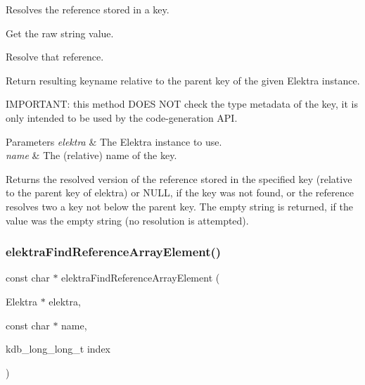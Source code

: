 Resolves the reference stored in a key. 


\begin{DoxyEnumerate}
\item Get the raw string value.
\item Resolve that reference.
\item Return resulting keyname relative to the parent key of the given Elektra instance.
\end{DoxyEnumerate}

I\+M\+P\+O\+R\+T\+A\+NT\+: this method D\+O\+ES N\+OT check the type metadata of the key, it is only intended to be used by the code-\/generation A\+PI.


\begin{DoxyParams}{Parameters}
{\em elektra} & The Elektra instance to use. \\
\hline
{\em name} & The (relative) name of the key. \\
\hline
\end{DoxyParams}
\begin{DoxyReturn}{Returns}
the resolved version of the reference stored in the specified key (relative to the parent key of {\ttfamily elektra}) or N\+U\+LL, if the key was not found, or the reference resolves two a key not below the parent key. The empty string is returned, if the value was the empty string (no resolution is attempted). 
\end{DoxyReturn}
\mbox{\label{group__highlevel_ga16e022b631da118ca67901495029a844}} 
\subsubsection{\texorpdfstring{elektra\+Find\+Reference\+Array\+Element()}{elektraFindReferenceArrayElement()}}
{\footnotesize\ttfamily const char $\ast$ elektra\+Find\+Reference\+Array\+Element (\begin{DoxyParamCaption}\item[{Elektra $\ast$}]{elektra,  }\item[{const char $\ast$}]{name,  }\item[{kdb\+\_\+long\+\_\+long\+\_\+t}]{index }\end{DoxyParamCaption})}



